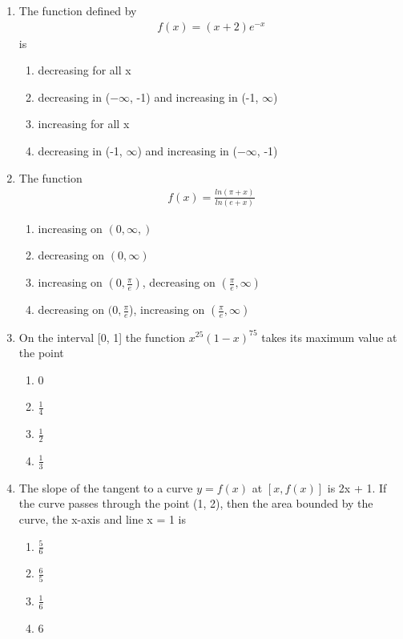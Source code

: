 \begin{enumerate}[label=\arabic*.,ref=\thesubsection.\theenumi]
\item The function defined by 
\begin{align*} 
f(x) = (x + 2)e^{-x} 
\end{align*} 
is
\begin{enumerate}
\item decreasing for all x
\item decreasing in ($-\infty$, -1) and increasing in (-1, $\infty$) 
\item increasing for all x
\item decreasing in (-1, $\infty$) and increasing in ($-\infty$, -1) 
\end{enumerate}

\item The function 
\begin{align*}
f(x) = \frac{ln(\pi + x)}{ln(e + x)}
\end{align*}
\begin{enumerate}
\item increasing on $(0, \infty,)$ 
\item decreasing on $(0, \infty)$
\item increasing on $(0, \frac{\pi}{e})$, decreasing on $(\frac{\pi}{e}, \infty)$
\item decreasing on $(0, \frac{\pi}{e}$), increasing on $(\frac{\pi}{e}, \infty)$
\end{enumerate}

\item On the interval [0, 1] the function $x^{25}(1 - x)^{75}$ takes its maximum value at the point
\begin{enumerate}
\item 0
\item $\frac{1}{4}$
\item $\frac{1}{2}$
\item $\frac{1}{3}$
\end{enumerate}

\item The slope of the tangent to a curve  
$y = f(x)$ at $[x, f(x)]$ is 2x + 1. If the curve passes through the point (1, 2), then the area bounded by the curve, the x-axis and line x = 1 is
\begin{enumerate}
\item $\frac{5}{6}$
\item $\frac{6}{5}$
\item $\frac{1}{6}$
\item 6
\end{enumerate}


\end{enumerate}
